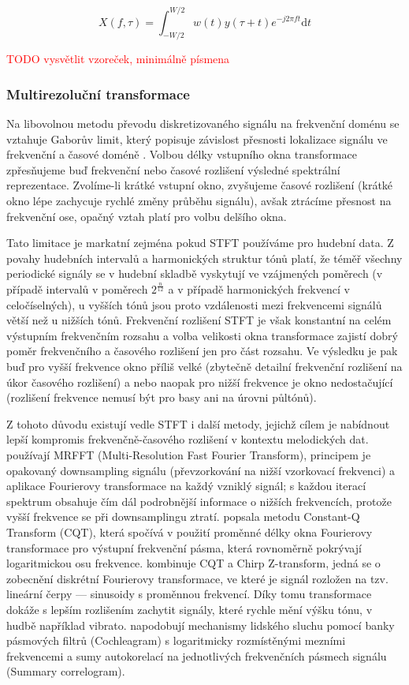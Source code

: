     $$X(f, \tau) = \int_{-W/2}^{W/2}{w(t)y(\tau + t)e^{-j2\pi f t} \mathrm{d}t}$$

\textcolor{red}{TODO vysvětlit vzoreček, minimálně písmena}

\subsubsection{Multirezoluční transformace}

Na libovolnou metodu převodu diskretizovaného signálu na frekvenční doménu se vztahuje Gaborův limit, který popisuje závislost přesnosti lokalizace signálu ve frekvenční a časové doméně \citep{Gabor1945}. Volbou délky vstupního okna transformace zpřesňujeme buď frekvenční nebo časové rozlišení výsledné spektrální reprezentace. Zvolíme-li krátké vstupní okno, zvyšujeme časové rozlišení (krátké okno lépe zachycuje rychlé změny průběhu signálu), avšak ztrácíme přesnost na frekvenční ose, opačný vztah platí pro volbu delšího okna.

Tato limitace je markatní zejména pokud STFT používáme pro hudební data. Z povahy hudebních intervalů a harmonických struktur tónů platí, že téměř všechny periodické signály se v hudební skladbě vyskytují ve vzájmených poměrech (v případě intervalů v poměrech $2^{\frac{n}{12}}$ a v případě harmonických frekvencí v celočíselných), u vyšších tónů jsou proto vzdálenosti mezi frekvencemi signálů větší než u nižších tónů. Frekvenční rozlišení STFT je však konstantní na celém výstupním frekvenčním rozsahu a volba velikosti okna transformace zajistí dobrý poměr frekvenčního a časového rozlišení jen pro část rozsahu. Ve výsledku je pak buď pro vyšší frekvence okno příliš velké (zbytečně detailní frekvenční rozlišení na úkor časového rozlišení) a nebo naopak pro nižší frekvence je okno nedostačující (rozlišení frekvence nemusí být pro basy ani na úrovni půltónů).

Z tohoto důvodu existují vedle STFT i další metody, jejichž cílem je nabídnout lepší kompromis frekvenčně-časového rozlišení v kontextu melodických dat. \cite{Goto1999} používají MRFFT (Multi-Resolution Fast Fourier Transform), principem je opakovaný downsampling signálu (převzorkování na nižší vzorkovací frekvenci) a aplikace Fourierovy transformace na každý vzniklý signál; s každou iterací spektrum obsahuje čím dál podrobnější informace o nižších frekvencích, protože vyšší frekvence se při downsamplingu ztratí. \cite{Brown1990} popsala metodu Constant-Q Transform (CQT), která spočívá v použití proměnné délky okna Fourierovy transformace pro výstupní frekvenční pásma, která rovnoměrně pokrývají logaritmickou osu frekvence. \cite{Cancela2010} kombinuje CQT a Chirp Z-transform, jedná se o zobecnění diskrétní Fourierovy transformace, ve které je signál rozložen na tzv. lineární čerpy --- sinusoidy s proměnnou frekvencí. Díky tomu transformace dokáže s lepším rozlišením zachytit signály, které rychle mění výšku tónu, v hudbě například vibrato. \cite{Paiva2004} napodobují mechanismy lidského sluchu pomocí banky pásmových filtrů (Cochleagram) s logaritmicky rozmístěnými mezními frekvencemi a sumy autokorelací na jednotlivých frekvenčních pásmech signálu (Summary correlogram).

